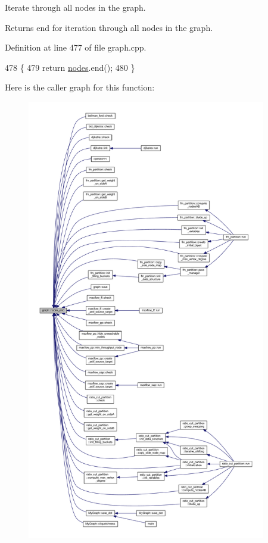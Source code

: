 Iterate through all nodes in the graph.

\begin{DoxyReturn}{Returns}
end for iteration through all nodes in the graph. 
\end{DoxyReturn}


Definition at line 477 of file graph.\+cpp.


\begin{DoxyCode}
478 \{
479     \textcolor{keywordflow}{return} \mbox{\hyperlink{classgraph_a4ea0592e8eb7c26c5abad24546907726}{nodes}}.end();
480 \}
\end{DoxyCode}
Here is the caller graph for this function\+:
\nopagebreak
\begin{figure}[H]
\begin{center}
\leavevmode
\includegraphics[height=550pt]{classgraph_abbf9c0cb5629e98e1142254911238173_icgraph}
\end{center}
\end{figure}
\mbox{\label{classgraph_aa4fcbe7bf572dc800068873ccfb4d95a}} 
